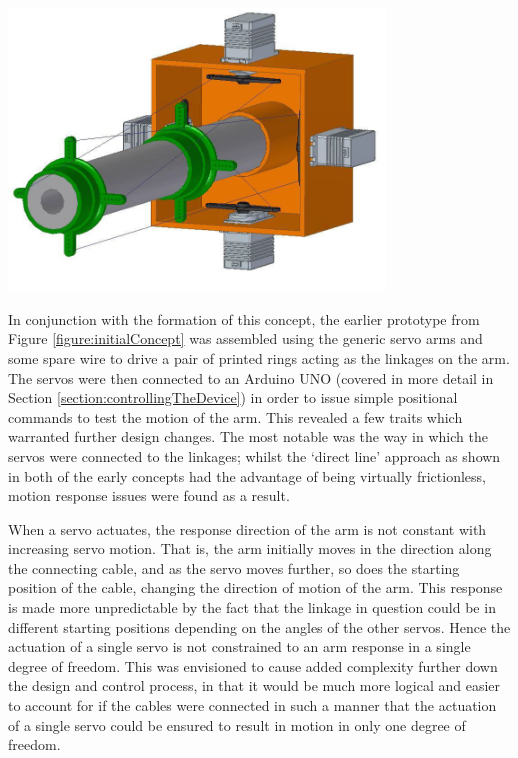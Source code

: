 \documentclass[11pt]{article}
\begin{document}
\begin{center}
\includegraphics[width=0.75\textwidth]{images/cubicConcept.png}
\label{figure:cubicConcept}
\end{center}

In conjunction with the formation of this concept, the earlier prototype from Figure \ref{figure:initialConcept} was assembled using the generic servo arms and some spare wire to drive a pair of printed rings acting as the linkages on the arm. The servos were then connected to an Arduino UNO (covered in more detail in Section \ref{section:controllingTheDevice}) in order to issue simple positional commands to test the motion of the arm. This revealed a few traits which warranted further design changes. The most notable was the way in which the servos were connected to the linkages; whilst the `direct line' approach as shown in both of the early concepts had the advantage of being virtually frictionless, motion response issues were found as a result. 

When a servo actuates, the response direction of the arm is not constant with increasing servo motion. That is, the arm initially moves in the direction along the connecting cable, and as the servo moves further, so does the starting position of the cable, changing the direction of motion of the arm. This response is made more unpredictable by the fact that the linkage in question could be in different starting positions depending on the angles of the other servos. Hence the actuation of a single servo is not constrained to an arm response in a single degree of freedom. This was envisioned to cause added complexity further down the design and control process, in that it would be much more logical and easier to account for if the cables were connected in such a manner that the actuation of a single servo could be ensured to result in motion in only one degree of freedom.
\end{document}
